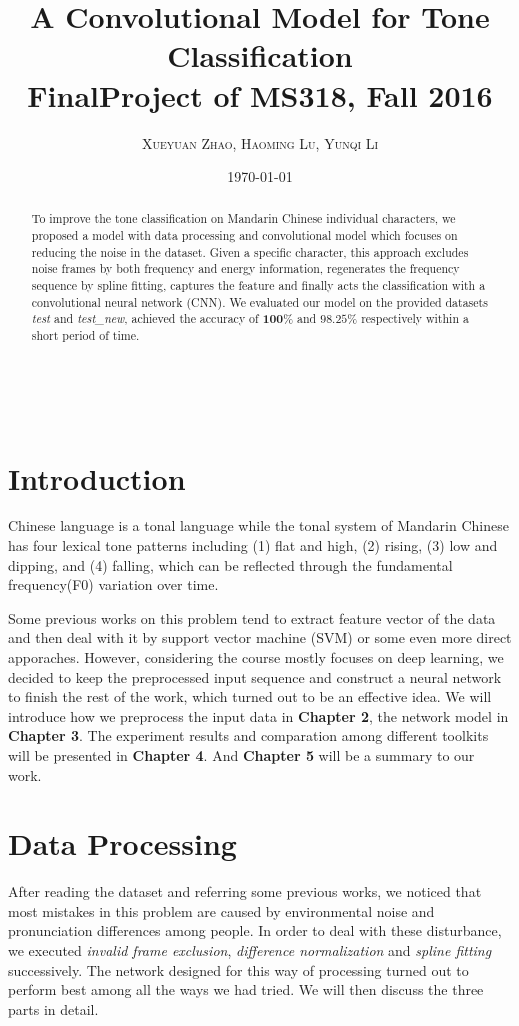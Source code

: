 \documentclass[a4paper, 11pt]{article} %
\title{\textbf{A Convolutional Model for Tone Classification}\\ \vspace{0.5cm}
{FinalProject of MS318, Fall 2016}}
\author{\textsc{Xueyuan Zhao, Haoming Lu, Yunqi Li} 
\\{\textit{}}}
\date{\today}
\makeatletter
\renewcommand{\maketitle}{ %
\begin{flushright} %
{\LARGE\@title} %

\vspace{50pt} %

{\large\@author} %
\\\@date %

\vspace{40pt} %
\end{flushright}
}
\makeatother
\begin{document}
\maketitle

\begin{abstract}
To improve the tone classification on Mandarin Chinese individual characters, we proposed a model with data processing and convolutional model which focuses on reducing the noise in the dataset. Given a specific character, this approach excludes noise frames by both frequency and energy information, regenerates the frequency sequence by spline fitting, captures the feature and finally acts the classification with a convolutional neural network (CNN).  We evaluated our model on the provided datasets \textit{test} and \textit{test\_new}, achieved the accuracy of $\mathbf{100\%}$ and $\mathbf{98.25\%}$ respectively within a short period of time.
\end{abstract}

\vspace{30pt} 

\section{Introduction}
\indent
Chinese language is a tonal language while the tonal system of Mandarin Chinese has four lexical tone patterns including (1) flat and high, (2) rising, (3) low and dipping, and (4) falling, which can be reflected through the fundamental frequency(F0) variation over time. 
\par
Some previous works on this problem tend to extract feature vector of the data and then deal with it by support vector machine (SVM)\cite{wang2009tone} or some even more direct apporaches. However, considering the course mostly focuses on deep learning, we decided to keep the preprocessed input sequence and construct a neural network to finish the rest of the work, which turned out to be an effective idea. We will introduce how we preprocess the input data in \textbf{Chapter 2}, the network model in \textbf{Chapter 3}. The experiment results and comparation among different toolkits will be presented in \textbf{Chapter 4}. And \textbf{Chapter 5} will be a summary to our work.

\section{Data Processing}
After reading the dataset and referring some previous works, we noticed that most mistakes in this problem are caused by environmental noise and pronunciation differences among people. In order to deal with these disturbance, we executed \textit{invalid frame exclusion}, \textit{difference normalization} and \textit{spline fitting} successively. The network designed for this way of processing turned out to perform best among all the ways we had tried. We will then discuss the three parts in detail.
\\
\end{document}
